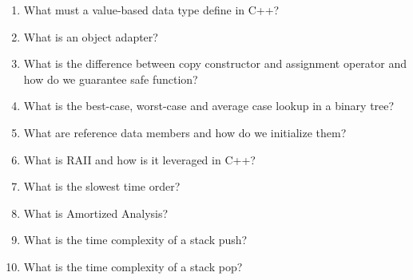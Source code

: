 \documentclass[11pt, letterpaper]{article}
\begin{document}
\begin{enumerate}[leftmargin=*, label=\textbf{\arabic*.}]
  \item What must a value-based data type define in C++?
    \begin{answerspace}
    \end{answerspace}

  \item What is an object adapter?
    \begin{answerspace}
    \end{answerspace}

  \item What is the difference between copy constructor and assignment operator and how do we guarantee safe function?
    \begin{answerspace}
    \end{answerspace}
    
    \clearpage

  \item What is the best-case, worst-case and average case lookup in a binary tree?
    \begin{answerspace}
    \end{answerspace}

  \item What are reference data members and how do we initialize them?
    \begin{answerspace}
    \end{answerspace}

  \item What is RAII and how is it leveraged in C++?
    \begin{answerspace}
    \end{answerspace}

  \item What is the slowest time order?
    \begin{answerspace}
    \end{answerspace}

  \item What is Amortized Analysis?
    \begin{answerspace}
    \end{answerspace}

  \item What is the time complexity of a stack push?
    \begin{answerspace}
    \end{answerspace}

  \item What is the time complexity of a stack pop?
    \begin{answerspace}
    \end{answerspace}


\end{enumerate}
\end{document}
